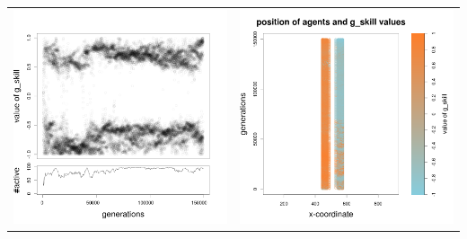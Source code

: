 \documentclass[a4paper,10pt]{article}
\begin{document}
\begin{table}[h!]
\begin{tabular}{cc}
 \newline
 \includegraphics[width=\imgSize]{images/5StaticEnv/Gplot8_staticEnv3}&\includegraphics[width=\imgSize]{images/5StaticEnv/Gplot8Static_staticEnv3}\\

\end{tabular}
\end{table}
\end{document}
